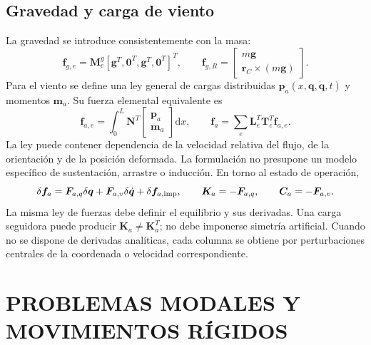\documentclass[oneside,a4paper,spanish,links,pagenumbers]{amca}
\newcommand{\dd}{\mathrm{d}}
\begin{document}
\subsection{Gravedad y carga de viento}
La gravedad se introduce consistentemente con la masa:
\begin{equation}
\bm f_{g,e}=\bm M_e^g[\bm g^T,\bm0^T,\bm g^T,\bm0^T]^T,
\qquad
\bm f_{g,R}=\begin{bmatrix}m\bm g\\\bm r_C\times(m\bm g)\end{bmatrix}.
\end{equation}
Para el viento se define una ley general de cargas distribuidas $\bm p_a(x,\bm q,\dot{\bm q},t)$ y momentos $\bm m_a$. Su fuerza elemental equivalente es
\begin{equation}
\bm f_{a,e}=\int_0^L\bm N^T
\begin{bmatrix}\bm p_a\\\bm m_a\end{bmatrix}\dd x,
\qquad \bm f_a=\sum_e\bm L_e^T\bm T_e^T\bm f_{a,e}.
\end{equation}
La ley puede contener dependencia de la velocidad relativa del flujo, de la orientación y de la posición deformada. La formulación no presupone un modelo específico de sustentación, arrastre o inducción. En torno al estado de operación,
\begin{equation}
\delta\bm f_a=\bm F_{a,q}\delta\bm q+\bm F_{a,v}\delta\dot{\bm q}
+\delta\bm f_{a,\rm imp},
\qquad \bm K_a=-\bm F_{a,q},\qquad\bm C_a=-\bm F_{a,v}.
\end{equation}
La misma ley de fuerzas debe definir el equilibrio y sus derivadas. Una carga seguidora puede producir $\bm K_a\ne\bm K_a^T$; no debe imponerse simetría artificial. Cuando no se dispone de derivadas analíticas, cada columna se obtiene por perturbaciones centrales de la coordenada o velocidad correspondiente.

\section{PROBLEMAS MODALES Y MOVIMIENTOS RÍGIDOS}
\end{document}
